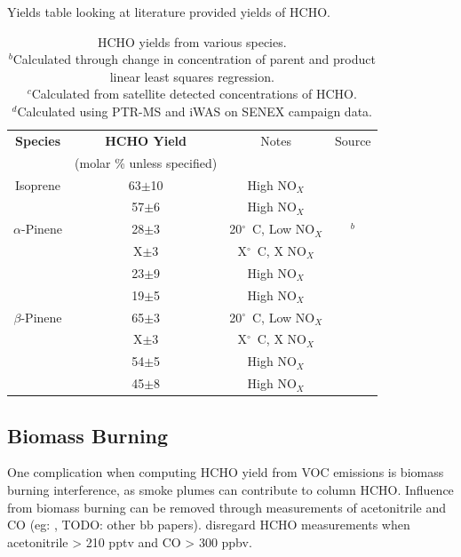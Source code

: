     Yields table looking at literature provided yields of HCHO.
    \begin{table}
    \begin{tabular}{ | c | c | c | c |  }
      \hline
      \textbf{Species} & \textbf{HCHO Yield} & Notes & Source
      \\ & (molar \% unless specified) & & 
      \\ \hline
      Isoprene & 63$\pm$10  & High NO$_X$ & \citep{AtkinsenArey2003}
      \\
      & 57$\pm$6  & High NO$_X$ & \citep{AtkinsenArey2003}
      \\
      $\alpha$-Pinene & 28$\pm$3 & 20$^\circ$~C, Low NO$_X$ & \citep{Lee2006}$^b$
      \\ 
      & X$\pm$3 & X$^\circ$~C, X NO$_X$ & \citep{Wolfe2016}
      \\ 
      & 23$\pm$9 & High NO$_X$ & \citep{AtkinsenArey2003}
      \\ 
      & 19$\pm$5 & High NO$_X$ & \citep{AtkinsenArey2003}
      \\ 
      $\beta$-Pinene & 65$\pm$3 & 20$^\circ$~C, Low NO$_X$ & \citep{Lee2006}
      \\ 
      & X$\pm$3 & X$^\circ$~C, X NO$_X$ & \citep{Wolfe2016}
      \\ 
      & 54$\pm$5 & High NO$_X$ & \citep{AtkinsenArey2003}
      \\ 
      & 45$\pm$8 & High NO$_X$ & \citep{AtkinsenArey2003}
      \\ 
      \hline
    \end{tabular}
    \caption{HCHO yields from various species. \hspace{\textwidth} \\ 
      ${}^b$Calculated through change in concentration of parent and product linear least squares regression. \hspace{\textwidth} \\
      ${}^c$Calculated from satellite detected concentrations of HCHO. \hspace{\textwidth} \\
      ${}^d$Calculated using PTR-MS and iWAS on SENEX campaign data.
    }
    \label{ch_isop:tab:VOCLiteratureYields}
    \end{table}

  \subsection{Biomass Burning}
    One complication when computing HCHO yield from VOC emissions is biomass burning interference, as smoke plumes can contribute to column HCHO.
    Influence from biomass burning can be removed through measurements of acetonitrile and CO (eg: \citep{Wolfe2016}, TODO: other bb papers).
    \citet{Wolfe2016} disregard HCHO measurements when acetonitrile > 210 pptv and CO > 300 ppbv.
    
